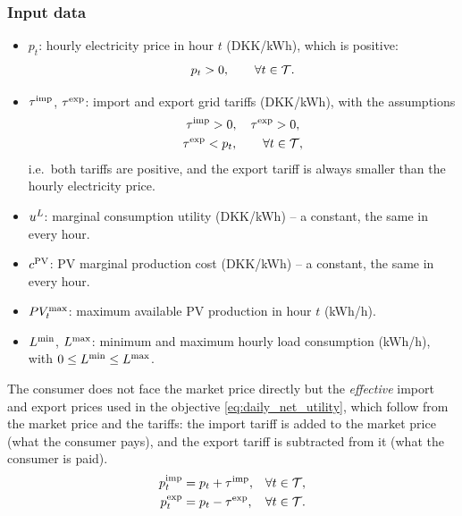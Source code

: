 \subsubsection{Input data}
\begin{itemize}
    \item $p_t$: hourly electricity price in hour $t$ (DKK/kWh), which is positive:
    \begin{equation}
        p_t > 0, \qquad \forall t \in \mathcal{T}.
        \label{eq:price_positive}
    \end{equation}
    \item $\tau^{\mathrm{imp}}$, $\tau^{\mathrm{exp}}$: import and export grid tariffs (DKK/kWh), with the
    assumptions
    \begin{gather}
        \tau^{\mathrm{imp}} > 0, \quad \tau^{\mathrm{exp}} > 0, \label{eq:tariff_positive} \\
        \tau^{\mathrm{exp}} < p_t, \qquad \forall t \in \mathcal{T}, \label{eq:tariff_assumption}
    \end{gather}
    i.e.\ both tariffs are positive, and the export tariff is always smaller than the hourly
    electricity price.
    \item $u^{L}$: marginal consumption utility (DKK/kWh) -- a constant, the same in every
    hour.
    \item $c^{\mathrm{PV}}$: PV marginal production cost (DKK/kWh) -- a constant, the same in every
    hour.
    \item $PV_{t}^{\max}$: maximum available PV production in hour $t$ (kWh/h).
    \item $L^{\min}$, $L^{\max}$: minimum and maximum hourly load consumption (kWh/h), with
    $0 \leq L^{\min} \leq L^{\max}$.
\end{itemize}
The consumer does not face the market price directly but the \emph{effective} import and
export prices used in the objective \eqref{eq:daily_net_utility}, which follow from the
market price and the tariffs: the import tariff is added to the market price (what the
consumer pays), and the export tariff is subtracted from it (what the consumer is paid).
\begin{align}
    p^{\mathrm{imp}}_{t} &= p_t + \tau^{\mathrm{imp}}, & \forall t \in \mathcal{T}, \label{eq:effective_import_price} \\
    p^{\mathrm{exp}}_{t} &= p_t - \tau^{\mathrm{exp}}, & \forall t \in \mathcal{T}. \label{eq:effective_export_price}
\end{align}

